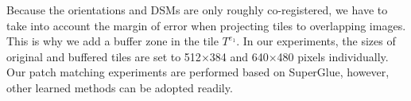 Because the orientations and \ac{DSM}s are only roughly co-registered, we have to take into account the margin of error when projecting tiles to overlapping images. This is why we add a buffer zone in the tile $T^{e_1}$. In our experiments, the sizes of original and buffered tiles are set to 512$\times$384 and 640$\times$480 pixels individually.\\
Our patch matching experiments are performed based on SuperGlue, however, other learned methods can be adopted readily. \\

\begin{figure}[htbp]
	\begin{center}
\end{center}
\end{figure}
